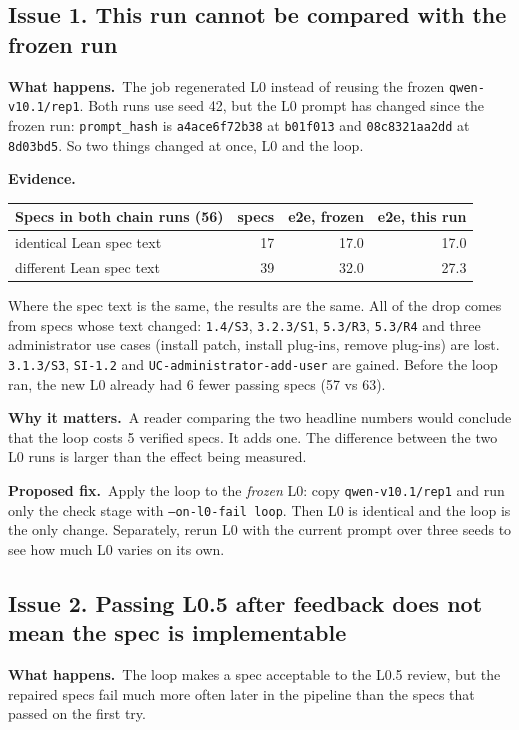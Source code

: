 \documentclass[10pt,a4paper]{article}
\newcommand{\code}[1]{\texttt{\small #1}}
\newcommand{\what}{\par\smallskip\textbf{What happens.}~}
\newcommand{\evidence}{\par\smallskip\textbf{Evidence.}~}
\newcommand{\why}{\par\smallskip\textbf{Why it matters.}~}
\newcommand{\fix}{\par\smallskip\textbf{Proposed fix.}~}
\begin{document}
\subsection*{Issue 1. This run cannot be compared with the frozen run}
\what The job regenerated L0 instead of reusing the frozen \code{qwen-v10.1/rep1}. Both runs use seed 42, but the L0 prompt
has changed since the frozen run: \code{prompt\_hash} is \code{a4ace6f72b38} at \code{b01f013} and \code{08c8321aa2dd} at
\code{8d03bd5}. So two things changed at once, L0 and the loop.

\evidence
\begin{center}
\begin{tabular}{@{}lrrr@{}}
\toprule
Specs in both chain runs (56) & specs & e2e, frozen & e2e, this run \\
\midrule
identical Lean spec text          & 17 & 17.0 & 17.0 \\
different Lean spec text          & 39 & 32.0 & 27.3 \\
\bottomrule
\end{tabular}
\end{center}
Where the spec text is the same, the results are the same. All of the drop comes from specs whose text changed:
\code{1.4/S3}, \code{3.2.3/S1}, \code{5.3/R3}, \code{5.3/R4} and three administrator use cases (install patch, install
plug-ins, remove plug-ins) are lost. \code{3.1.3/S3}, \code{SI-1.2} and \code{UC-administrator-add-user} are gained.
Before the loop ran, the new L0 already had 6 fewer passing specs (57 vs 63).

\why A reader comparing the two headline numbers would conclude that the loop costs 5 verified specs. It adds one. The
difference between the two L0 runs is larger than the effect being measured.

\fix Apply the loop to the \emph{frozen} L0: copy \code{qwen-v10.1/rep1} and run only the check stage with
\code{--on-l0-fail loop}. Then L0 is identical and the loop is the only change. Separately, rerun L0 with the current prompt
over three seeds to see how much L0 varies on its own.

\subsection*{Issue 2. Passing L0.5 after feedback does not mean the spec is implementable}
\what The loop makes a spec acceptable to the L0.5 review, but the repaired specs fail much more often later in the
pipeline than the specs that passed on the first try.
\end{document}
